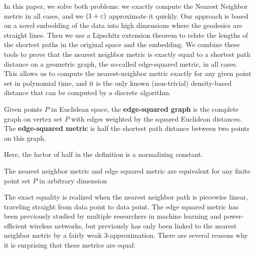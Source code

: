 In this paper, we solve both problems: we exactly compute the Nearest
Neighbor metric in all cases, and we $(1+\varepsilon)$ approximate it quickly.
Our approach is based on a novel embedding of the data into high dimensions where the geodesics are straight lines.
Then we use a Lipschitz extension theorem to relate the lengths of the shortest paths in the original space and the embedding.
We combine these tools to prove that the nearest neighbor metric is exactly equal to a shortest path distance on a geometric graph, the so-called edge-squared metric, in all cases.
This allows us to compute the nearest-neighbor metric exactly for any given point set in polynomial time, and it is the only known (non-trivial) density-based distance that can be computed by a discrete algorithm.

\begin{definition}
  Given points $P$ in Euclidean space, the \textbf{edge-squared graph} is the complete graph on vertex set $P$ with edges weighted by the squared Euclidean distances.
  The \textbf{edge-squared metric} is half the shortest path distance between two points on this graph.
\end{definition}

Here, the factor of half in the definition is a normalizing constant.

\begin{theorem}\label{thm:NN} The nearest neighbor metric and edge squared
metric are equivalent for any finite point set $P$ in arbitrary dimension
\end{theorem}

The exact equality is realized when the nearest neighbor path is piecewise
linear, traveling straight from data point to data point.
The edge squared metric has been previously studied by multiple researchers in machine learning and power-efficient wireless networks, but previously has only been linked to the nearest neighbor metric by a fairly weak 3-approximation.
There are several reasons why it is surprising that these metrics are equal:

